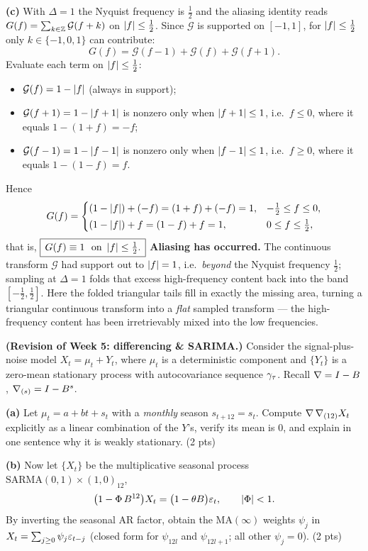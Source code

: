\documentclass[11pt]{article}
\begin{document}
\textbf{(c)} With $\Delta=1$ the Nyquist frequency is $\tfrac12$ and the aliasing identity reads $G(f)=\sum_{k\in\mathbb{Z}}\mathcal G(f+k)$ on $\left\lvert f \right\rvert\le\tfrac12$. Since $\mathcal G$ is supported on $[-1,1]$, for $\left\lvert f \right\rvert\le\tfrac12$ only $k\in\{-1,0,1\}$ can contribute:
\[
G(f)=\mathcal G(f-1)+\mathcal G(f)+\mathcal G(f+1).
\]
Evaluate each term on $\left\lvert f \right\rvert\le\tfrac12$:
\begin{itemize}
  \item $\mathcal G(f)=1-\left\lvert f \right\rvert$ (always in support);
  \item $\mathcal G(f+1)=1-\left\lvert f+1 \right\rvert$ is nonzero only when $\left\lvert f+1 \right\rvert\le1$, i.e.\ $f\le0$, where it equals $1-(1+f)=-f$;
  \item $\mathcal G(f-1)=1-\left\lvert f-1 \right\rvert$ is nonzero only when $\left\lvert f-1 \right\rvert\le1$, i.e.\ $f\ge0$, where it equals $1-(1-f)=f$.
\end{itemize}
Hence
\[
G(f)=
\begin{cases}
(1-\left\lvert f \right\rvert)+(-f)=(1+f)+(-f)=1, & -\tfrac12\le f\le 0,\\[2pt]
(1-\left\lvert f \right\rvert)+f=(1-f)+f=1, & 0\le f\le \tfrac12,
\end{cases}
\]
that is, $\boxed{\,G(f)\equiv1\ \text{ on }\left\lvert f \right\rvert\le\tfrac12.\,}$
\textbf{Aliasing has occurred.} The continuous transform $\mathcal G$ had support out to $\left\lvert f \right\rvert=1$, i.e.\ \emph{beyond} the Nyquist frequency $\tfrac12$; sampling at $\Delta=1$ folds that excess high-frequency content back into the band $[-\tfrac12,\tfrac12]$. Here the folded triangular tails fill in exactly the missing area, turning a triangular continuous transform into a \emph{flat} sampled transform --- the high-frequency content has been irretrievably mixed into the low frequencies.

\statementstart
\textbf{(Revision of Week 5: differencing \& SARIMA.)} Consider the signal-plus-noise model $X_t=\mu_t+Y_t$, where $\mu_t$ is a deterministic component and $\{Y_t\}$ is a zero-mean stationary process with autocovariance sequence $\gamma_\tau$. Recall $\nabla=I-B$, $\nabla_{(s)}=I-B^{s}$.

\textbf{(a)} Let $\mu_t=a+bt+s_t$ with a \emph{monthly} season $s_{t+12}=s_t$. Compute $\nabla\,\nabla_{(12)}X_t$ explicitly as a linear combination of the $Y$'s, verify its mean is $0$, and explain in one sentence why it is weakly stationary. \hfill(2 pts)

\textbf{(b)} Now let $\{X_t\}$ be the multiplicative seasonal process $\mathrm{SARMA}(0,1)\times(1,0)_{12}$,
\[
\bigl(1-\Phi\,B^{12}\bigr)X_t=\bigl(1-\theta B\bigr)\varepsilon_t,
\qquad \left\lvert \Phi \right\rvert<1 .
\]
By inverting the seasonal AR factor, obtain the $\mathrm{MA}(\infty)$ weights $\psi_j$ in $X_t=\sum_{j\ge0}\psi_j\varepsilon_{t-j}$ (closed form for $\psi_{12l}$ and $\psi_{12l+1}$; all other $\psi_j=0$). \hfill(2 pts)
\end{document}
